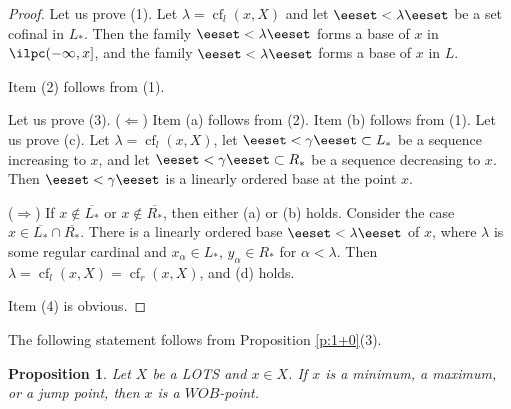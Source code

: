 \documentclass[preprint]{elsarticle}
\def\al{\alpha}
\def\ga{\gamma}
\def\la{\lambda}
\def\cl#1{\overline{#1}}
\def\set#1{\bbset#1\eeset}
\def\bbset#1:#2\eeset{\{#1\,:\,#2\}}
\newtheorem{proposition}{Proposition}[section]
\theoremstyle{definition}
\theoremstyle{remark}
\def\rarr{\Rightarrow}
\def\larr{\Leftarrow}
\def\cf{\operatorname{cf}}
\def\wob/{$WOB$}
\def\ilcomma/{\boldsymbol{,}}
\def\ilsymlp{\boldsymbol{(}}
\def\ilsymrp{\boldsymbol{)}}
\def\ilfont#1{\boldsymbol{#1}}
\def\ilfontX#1{\mathrm{\text{\texttt{\textbf{\large #1}}}}}
\def\ilfontX#1{{\text{\texttt{\textbf{\large \upshape #1}}}}}
\def\ilfont#1{\raisebox{-1.2pt}{\ilfontX{#1}}}
\def\ilfontC#1{\raisebox{-0.7pt}{\ilfontX{#1}}}
\def\ilcomma/{\ilfontC{,}}
\def\ilsymlp{\ilfont{(}}
\def\ilsymrp{\ilfont{)}}
\def\ilpp(#1,#2){\ilsymlp#1\ilcomma/ #2\ilsymrp}
\begin{document}
\begin{proof}
Let us prove (1).
Let $\la=\cf_l(x,X)$ and let $\set{x_\al:\al<\la}$ be a set cofinal in $L_*$. Then
the family $\set{\ilpc(x_\al,x]:\al<\la}$ forms a base of $x$ in $\ilpc(-\infty, x]$, and
the family $\set{\ilpc(x_\al,x]\cap X:\al<\la}$ forms a base of $x$ in $L$.

Item (2) follows from (1).

Let us prove (3). ($\larr$) 
Item (a) follows from (2). Item (b) follows from (1).
Let us prove (c). Let $\la=\cf_l(x,X)$, let $\set{x_\al:\al<\ga}\subset L_*$ be a sequence increasing to $x$, and let $\set{y_\al:\al<\ga}\subset R_*$ be a sequence decreasing to $x$.
Then $\set{\ilpp(x_\al,y_\al)\cap X:\al<\ga}$ is a linearly ordered base at the point $x$.

($\rarr$) If $x\notin \cl{L_*}$ or $x\notin \cl{R_*}$, then either (a) or (b) holds.
Consider the case $x\in \cl{L_*}\cap \cl{R_*}$. There is a linearly ordered base $\set{\ilpp(x_\al,y_\la)\cap X:\al<\la}$ of $x$, where $\la$ is some regular cardinal and $x_\al\in L_*$, $y_\al\in R_*$ for $\al<\la$. Then $\la=\cf_l(x,X)=\cf_r(x,X)$, and (d) holds.

Item (4) is obvious.
\end{proof}

The following statement follows from Proposition \ref{p:1+0}(3).


\begin{proposition}\label{p:1+0.5}
Let $X$ be a LOTS and $x\in X$. If $x$ is a minimum, a maximum, or a jump point, then $x$ is a \wob/-point.
\end{proposition}
\end{document}
